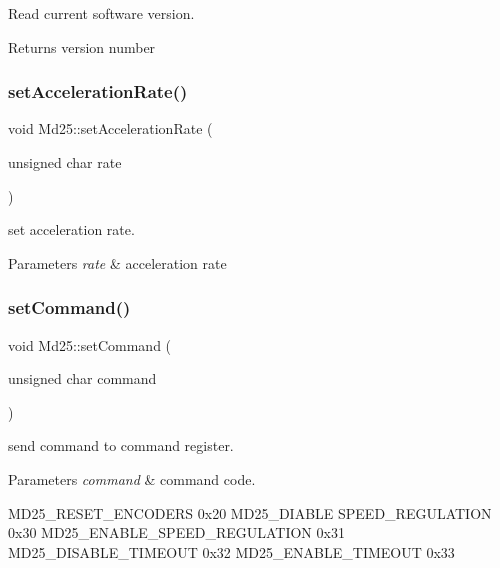 Read current software version. 

\begin{DoxyReturn}{Returns}
version number 
\end{DoxyReturn}
\mbox{\label{classMd25_a867fba5da9401423ee3dabfc18bbc1ed}} 
\subsubsection{\texorpdfstring{set\+Acceleration\+Rate()}{setAccelerationRate()}}
{\footnotesize\ttfamily void Md25\+::set\+Acceleration\+Rate (\begin{DoxyParamCaption}\item[{unsigned char}]{rate }\end{DoxyParamCaption})}



set acceleration rate. 


\begin{DoxyParams}{Parameters}
{\em rate} & acceleration rate \\
\hline
\end{DoxyParams}
\mbox{\label{classMd25_a470d70216b3a09da61e59a2074619ee2}} 
\subsubsection{\texorpdfstring{set\+Command()}{setCommand()}}
{\footnotesize\ttfamily void Md25\+::set\+Command (\begin{DoxyParamCaption}\item[{unsigned char}]{command }\end{DoxyParamCaption})}



send command to command register. 


\begin{DoxyParams}{Parameters}
{\em command} & command code.\\
\hline
\end{DoxyParams}
M\+D25\+\_\+\+R\+E\+S\+E\+T\+\_\+\+E\+N\+C\+O\+D\+E\+RS 0x20 M\+D25\+\_\+\+D\+I\+A\+B\+LE S\+P\+E\+E\+D\+\_\+\+R\+E\+G\+U\+L\+A\+T\+I\+ON 0x30 M\+D25\+\_\+\+E\+N\+A\+B\+L\+E\+\_\+\+S\+P\+E\+E\+D\+\_\+\+R\+E\+G\+U\+L\+A\+T\+I\+ON 0x31 M\+D25\+\_\+\+D\+I\+S\+A\+B\+L\+E\+\_\+\+T\+I\+M\+E\+O\+UT 0x32 M\+D25\+\_\+\+E\+N\+A\+B\+L\+E\+\_\+\+T\+I\+M\+E\+O\+UT 0x33 \mbox{\label{classMd25_a4f1c692574af8ecc2b7a3d3a35a26d51}} 
